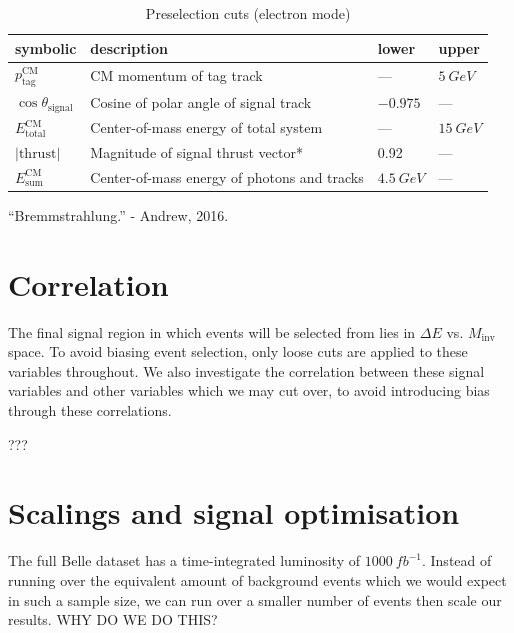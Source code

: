\documentclass[12pt,a4paper]{article} %
\begin{document}
\begin{table}[h]
\centering
\begin{tabular}{llll}
\textbf{symbolic} & \textbf{description} & \textbf{lower} & \textbf{upper} \\ \hline
$p_{\text{tag}}^{\text{CM}}$  & CM momentum of tag track & --- & $\SI{5}{GeV}$ \\
$\cos\theta_{\text{signal}}$ & Cosine of polar angle of signal track & $-0.975$ & --- \\
$E_{\text{total}}^{\text{CM}}$ & Center-of-mass energy of total system  & --- & $\SI{15}{GeV}$ \\
$\lvert\text{thrust}\rvert$ & Magnitude of signal thrust vector* & 0.92 & --- \\
$E_{\text{sum}}^{\text{CM}}$ & Center-of-mass energy of photons and tracks & $\SI{4.5}{GeV}$ & ---
\end{tabular}
\caption{Preselection cuts (electron mode)}
\label{my-label}
\end{table}


``Bremmstrahlung.'' - Andrew, 2016.


\pagebreak


\section{Correlation}

The final signal region in which events will be selected from lies in $\Delta E$ vs. $M_{\text{inv}}$ space. To avoid biasing event selection, only loose cuts are applied to these variables throughout. We also investigate the correlation between these signal variables and other variables which we may cut over, to avoid introducing bias through these correlations. 

???

\pagebreak


\section{Scalings and signal optimisation}

The full Belle dataset has a time-integrated luminosity of $\SI{1000}{fb^{-1}}$. Instead of running over the equivalent amount of background events which we would expect in such a sample size, we can run over a smaller number of events then scale our results. WHY DO WE DO THIS?
\end{document}
